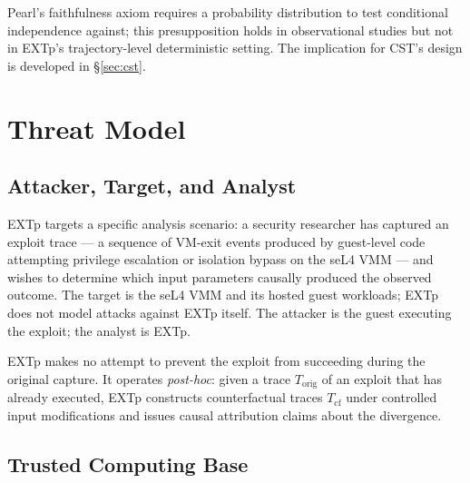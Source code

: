 \documentclass[conference]{IEEEtran}
\newcommand{\Korig}{T_\text{orig}}
\newcommand{\Tcf}{T_\text{cf}}
\begin{document}
Pearl's faithfulness axiom requires a probability distribution to
test conditional independence against; this presupposition holds in
observational studies but not in EXTp's trajectory-level
deterministic setting. The implication for CST's design is developed
in \S\ref{sec:cst}.

\section{Threat Model}\label{sec:threat}

\subsection*{Attacker, Target, and Analyst}

EXTp targets a specific analysis scenario: a security researcher has
captured an exploit trace --- a sequence of VM-exit events produced
by guest-level code attempting privilege escalation or isolation
bypass on the seL4 VMM --- and wishes to determine which input
parameters causally produced the observed outcome. The target is the
seL4 VMM and its hosted guest workloads; EXTp does not model attacks
against EXTp itself. The attacker is the guest executing the
exploit; the analyst is EXTp.

EXTp makes no attempt to prevent the exploit from succeeding during
the original capture. It operates \emph{post-hoc}: given a trace
$\Korig$ of an exploit that has already executed, EXTp constructs
counterfactual traces $\Tcf$ under controlled input modifications and
issues causal attribution claims about the divergence.

\subsection*{Trusted Computing Base}
\end{document}
